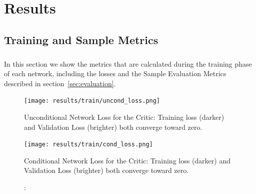 \chapter{Results}
\label{sec:results}
\section{Training and Sample Metrics}
\paragraph{} In this section we show the metrics that are calculated during the training phase of each network, including the losses and the Sample Evaluation Metrics described in section~\ref{sec:evaluation}.

\begin{figure}[!htb] 
	\begin{minipage}[b]{\linewidth}
		\centering
		\texttt{[image: results/train/uncond\_loss.png]} 
		\caption[Unconditional Network Loss]: {Unconditional Network Loss for the Critic: Training loss (darker) and Validation Loss (brighter) both converge toward zero.}
		\label{fig:train-uncond-loss}
	\end{minipage}
	
	\begin{minipage}[b]{\linewidth}
	\centering
	\texttt{[image: results/train/cond\_loss.png]} 
	\caption[Conditional Network Loss]: {Conditional Network Loss for the Critic: Training loss (darker) and Validation Loss (brighter) both converge toward zero.}
	\label{fig:train-cond-loss}
\end{minipage}
\end{figure}

